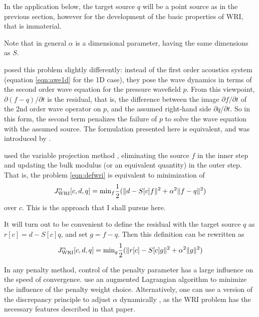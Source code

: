 In the application below, the target source $q$ will be a point source
as in the previous section, however for the development of the basic
properties of WRI, that is immaterial.

Note that in general $\alpha$ is a dimensional parameter, having the
same dimensions as $S$.

\cite{LeeuwenHerrmannWRI:13} posed this problem slightly differently:
instead of the first order acoustics system (equation \ref{eqn:awe1d}
for the 1D case), they pose the wave dynamics in terms of the second
order wave equation for the pressure wavefield $p$. From this
viewpoint, $\partial(f-q) /\partial t$ is the residual, that is, the
difference between the image $\partial f/\partial t$ of the 2nd order
wave operator on $p$, and the assumed right-hand side
$\partial q/\partial t$. So in this form, the second term penalizes
the failure of $p$ to solve the wave equation with the assumed
source. The formulation presented here is equivalent, and was
introduced by \cite{WangYingst:SEG16}.

\cite{LeeuwenHerrmann:16} used the variable projection method
\cite[]{GolubPereyra:03}, eliminating the source $f$ in the inner step
and updating the bulk modulus (or an equivalent quantity) in the outer
step. That is, the problem \ref{eqn:defwri} is equivalent to
minimization of
\[
  J_{\rm WRI}^{\alpha}[c,d,q] =
  \mbox{min}_f \frac{1}{2}(\| d-S[c]f\|^2+\alpha^2\|f-q\|^2)
\]
over $c$. This is the approach that I shall pursue here.

It will turn out to be convenient to define the residual with the
target source $q$ as $r[c]=d-S[c]q$, and set $g=f-q$. Then this
definition can be rewritten as
\begin{equation}
\label{eqn:defvpm}
  J_{\rm WRI}^{\alpha}[c,d,q] =\mbox{min}_g \frac{1}{2}(\| r[c]-S[c]g\|^2+\alpha^2\|g\|^2)
\end{equation}

In any penalty method, control of the penalty
parameter has a large influence on the speed of
convergence. \cite{Aghamiry:19} use an augmented Lagrangian algorithm
to minimize the influence of the penalty weight choice. Alternatively, one can use a version of the discrepancy principle to adjust $\alpha$ dynamically \cite[]{FuSymes2017discrepancy}, as the WRI problem has the necessary features described in that paper.

